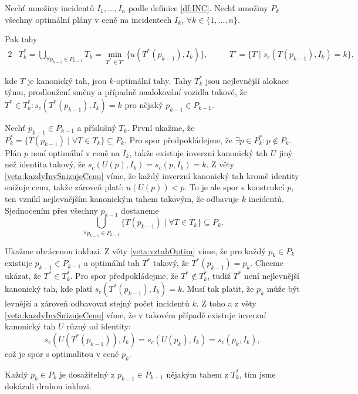 \begin{veta}\label{veta:konkrOptTahy}
  Nechť množiny incidentů $I_1, \dots, I_n$ podle definice \ref{df:INC}.
  Nechť množiny $P_{k}$ všechny optimální plány v ceně na incidentech $I_k$, $\forall k \in \{ 1, \dots, n \}$.

  Pak tahy 
  \begin{alignat*}{2}
    & T^*_k = \bigcup_{\forall p_{k-1} \in P_{k-1}} T_k = \min_{T^* \in T'} \{ u(T^*(p_{k-1}), I_k) \}, \quad && T' = \{ T \mid s_c(T(p_{k-1}), I_k) = k \},
  \end{alignat*}

  kde $T$ je kanonický tah, jsou $k$-optimální tahy.
  Tahy $T^*_k$ jsou nejlevnější alokace týmu, prodloužení směny a případně naalokování vozidla takové,
  že $T^* \in T^*_k \colon s_c(T^*(p_{k-1}), I_k) = k$ pro nějaký $p_{k-1} \in P_{k-1}$.
\end{veta}
\begin{dukaz}
  Nechť $p_{k-1} \in P_{k-1}$ a příslušný $T_k$. První ukažme, že $P^*_k = \{ T(p_{k-1}) \mid \forall T \in T_k \} \subseteq P_k$.
  Pro spor předpokládejme, že $\exists p \in P^*_k \colon p \not \in P_k$.
  Plán $p$ není optimální v ceně na $I_k$, takže existuje inverzní kanonický tah $U$ jiný než identita takový, že $s_c(U(p), I_k) = s_c(p, I_k) = k$.
  Z věty \ref{veta:kazdyInvSnizujeCenu} víme, že každý inverzní kanonický tah kromě identity snižuje cenu, takže zároveň platí: $u(U(p)) < p$.
  To je ale spor s konstrukcí $p$, ten vznikl nejlevnějším kanonickým tahem takovým, že odbavuje $k$ incidentů.
  Sjednocením přes všechny $p_{k-1}$ dostaneme 
  \begin{equation*}
    \bigcup_{\forall p_{k-1} \in P_{k-1}} \{ T(p_{k-1}) \mid \forall T \in T_k \} \subseteq P_k.
  \end{equation*}

  Ukažme obrácenou inkluzi. Z věty \ref{veta:vztahOptim} víme, že pro každý $p_k \in P_k$ existuje $p_{k-1} \in P_{k-1}$ a optimální tah $T^*$ takový,
  že $T^*(p_{k-1}) = p_k$. Chceme ukázat, že $T^* \in T^*_k$.
  Pro spor předpokládejme, že $T^* \not \in T^*_k$, tudiž $T^*$ není nejlevnější kanonický tah, kde platí $s_c(T^*(p_{k-1}), I_k) = k$.
  Musí tak platit, že $p_k$ může být levnější a zároveň odbavovat stejný počet incidentů $k$. 
  Z toho a z věty \ref{veta:kazdyInvSnizujeCenu} víme, že v takovém případě existuje inverzní kanonický tah $U$ různý od identity:
  \begin{equation*}
    s_c(U(T^*(p_{k-1})), I_k) = s_c(U(p_k), I_k) = s_c(p_k, I_k),
  \end{equation*}
  což je spor s optimalitou v ceně $p_k$.

  Každý $p_k \in P_k$ je dosažitelný z $p_{k-1} \in P_{k-1}$ nějakým tahem z $T^*_k$, tím jsme dokázali druhou inkluzi.
\end{dukaz}

